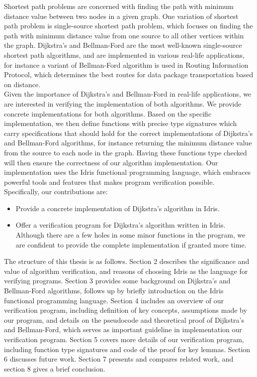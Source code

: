 
Shortest path problems are concerned with finding the path with minimum distance value between two nodes in a given graph. One variation of shortest path problem is single-source shortest path problem, which focuses on finding the path with minimum distance value from one source to all other vertices within the graph. Dijkstra's \cite{Dijkstras} and Bellman-Ford \cite{Bellman} are the most well-known single-source shortest path algorithms, and are implemented in various real-life applications, for instance a variant of Bellman-Ford algorithm is used in Routing Information Protocol, which determines the best routes for data package transportation based on distance. 
\\

Given the importance of Dijkstra's and Bellman-Ford in real-life applications, we are interested in verifying the implementation of both algorithms. We provide concrete implementations for both algorithms. Based on the specific implementation, we then define functions with precise type signatures which carry specifications that should hold for the correct implementations of Dijkstra's and Bellman-Ford algorithms, for instance returning the minimum distance value from the source to each node in the graph. Having these functions type checked will then ensure the correctness of our algorithm implementation. Our implementation uses the Idris functional programming language, which embraces powerful tools and features that makes program verification possible. 
\\

Specifically, our contributions are:
\begin{itemize}
	\item Provide a concrete implementation of Dijkstra's algorithm in Idris. 
	\item Offer a verification program for Dijkstra's algorithm written in Idris. Although there are a few holes in some minor functions in the program, we are confident to provide the complete implementation if granted more time. 
\end{itemize}

The structure of this thesis is as follows. Section 2 describes the significance and value of algorithm verification, and reasons of choosing Idris as the language for verifying programs. Section 3 provides some background on Dijkstra's and Bellman-Ford algorithms, follows up by briefly introduction on the Idris functional programming language. Section 4 includes an overview of our verification program, including definition of key concepts, assumptions made by our program, and details on the pseudocode and theoretical proof of Dijkstra's and Bellman-Ford, which serves as important guideline in implementation our verification program. Section 5 covers more details of our verification program, including function type signatures and code of the proof for key lemmas. Section 6 discusses future work. Section 7 presents and compares related work, and section 8 gives a brief conclusion.  